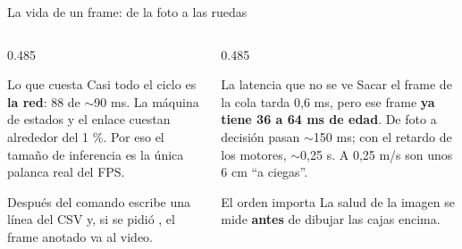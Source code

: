 \begin{frame}{La vida de un frame: de la foto a las ruedas}
  \vspace{0.5em}
  {\footnotesize
  \begin{columns}[T,onlytextwidth]
    \begin{column}{0.485\textwidth}
      \begin{block}{Lo que cuesta}
        Casi todo el ciclo es \textbf{la red}: 88 de $\sim$90 ms. La máquina de
        estados y el enlace cuestan alrededor del 1 \%. Por eso el tamaño de
        inferencia es la única palanca real del FPS.
      \end{block}
      \begin{block}{Después del comando}
         escribe una línea del CSV y, si se pidió
        , el frame anotado va al video.
      \end{block}
    \end{column}
    \begin{column}{0.485\textwidth}
      \begin{alertblock}{La latencia que no se ve}
        Sacar el frame de la cola tarda 0,6 ms, pero ese frame \textbf{ya
        tiene 36 a 64 ms de edad}. De foto a decisión pasan $\sim$150 ms; con
        el retardo de los motores, $\sim$0,25 s. A 0,25 m/s son unos 6 cm
        ``a ciegas''.
      \end{alertblock}
      \begin{block}{El orden importa}
        La salud de la imagen se mide \textbf{antes} de dibujar las cajas
        encima.
      \end{block}
    \end{column}
  \end{columns}}
\end{frame}

